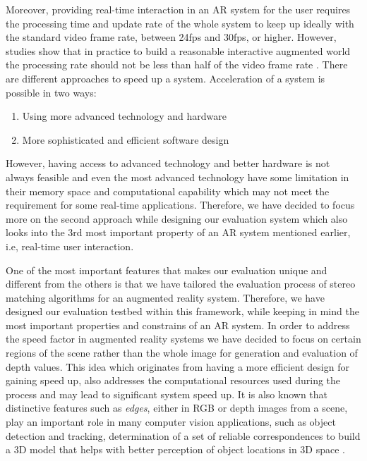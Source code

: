 \documentclass[12pt]{report}
\begin{document}
Moreover, providing real-time interaction in an AR system for the user requires the processing time and update rate of the whole system to keep up ideally with the standard video frame rate, 
between 24fps and 
30fps, or higher. 
However, studies show that in practice to build a reasonable interactive augmented world the processing rate should not be less than half of the video frame rate \cite{hertz00}. 
There are different approaches to speed up a system. Acceleration of a system is possible in two ways:
\begin{enumerate}
\item Using more advanced technology and hardware
\item More sophisticated and efficient software design
\end{enumerate}
However, having access to advanced technology and better hardware is not always feasible and even the most advanced technology have some limitation in their memory space and computational capability
which may not meet the requirement for some real-time applications. 
Therefore, we have decided to focus more on the second approach while designing our evaluation system which also looks into the 3rd most important property of
an AR system mentioned earlier, i.e, real-time user interaction. \newline 

One of the most important features that makes our evaluation unique and different from the others is that we have tailored the evaluation process of stereo matching algorithms for an augmented 
reality system. Therefore, we have designed our evaluation testbed within this framework, while keeping in mind the most important properties and constrains of an AR system.
In order to address the speed factor in augmented reality systems we have decided to focus on certain regions of the scene rather than the whole image for generation and evaluation of 
depth values.  
This idea which originates from having a more efficient design for gaining speed up, 
also addresses the computational resources used during the process and may lead to significant system speed up.
It is also known that distinctive features such as {\it edges}, either in RGB or depth images from a scene, play an important role in many computer vision applications, such as object detection and 
tracking, determination of a set of reliable correspondences to build a 3D model that helps with better perception of object locations in 3D space \cite{mart01,sze11}.
\end{document}
